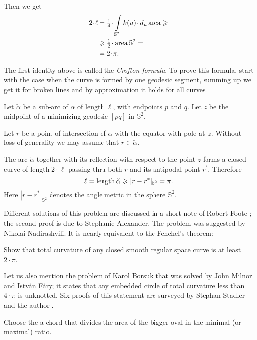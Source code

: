 Then we get
\begin{align*}
2\cdot\ell&=\tfrac14\cdot\int\limits_{\mathbb{S}^2}k(u)\cdot\, d_u\area\ge 
\\
&\ge\tfrac12\cdot\area\mathbb{S}^2=
\\
&=2\cdot\pi.
\end{align*}

The first identity above is called the \emph{Crofton formula}.
To prove this formula, start with the case when the curve is formed by one geodesic segment,
summing up we get it for broken lines
and by approximation it holds for all curves.
\qeds

Let $\check\alpha$ be a sub-arc of $\alpha$ of length $\ell$, with endpoints $p$ and $q$. 
Let $z$ be the midpoint of a minimizing geodesic $[pq]$ in $\mathbb{S}^2$. 

Let $r$ be a point of intersection of $\alpha$ with the equator with pole at~$z$. 
Without loss of generality we may assume that $r\in\check\alpha$. 

The arc $\check\alpha$ together with its reflection with respect to the point $z$ forms a closed curve of length $2\cdot \ell$ passing thru both $r$ and its antipodal point $r^{*}$.
Therefore 
\[\ell=\operatorname{\rm length} \check\alpha\geqslant |r-r^{*}|_{\mathbb S^2}=\pi.\]
Here $|r-r^{*}|_{\mathbb S^2}$ 
denotes the angle metric in the sphere $\mathbb S^2$.\qeds

Different solutions of this problem are discussed in a short note of Robert Foote \cite{foote};
the second proof is due to Stephanie Alexander.
The problem was suggested by Nikolai Nadirashvili.
It is nearly equivalent to the Fenchel's theorem: 

\begin{pr}
Show that total curvature of any closed smooth regular space curve is at least $2\cdot\pi$.
\end{pr}

Let us also mention the problem of Karol Borsuk that was solved by John Milnor and István Fáry;
it states that any embedded circle of total curvature less than $4\cdot\pi$ is unknotted.
Six proofs of this statement are surveyed by Stephan Stadler and the author \cite{petrunin-stadler-Fary-Milnor}.

Choose the a chord that divides the area of the bigger oval in the minimal (or maximal) ratio.

